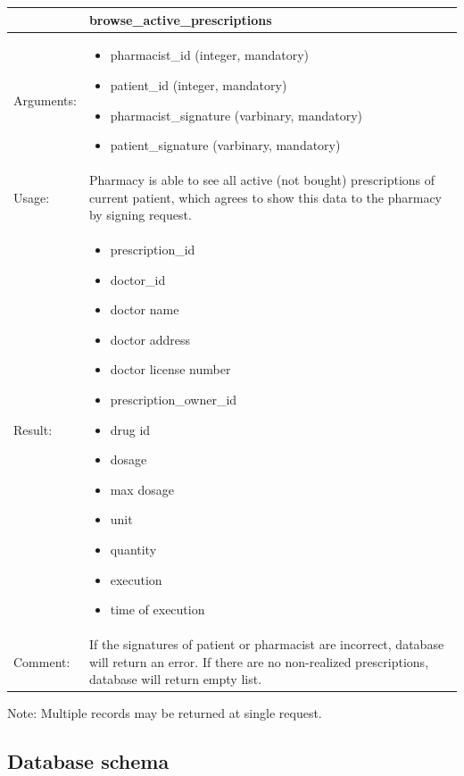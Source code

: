 
    \begin{longtable}{| p{6cm} | p{7.75cm} |}
    \hline
     & browse\_active\_prescriptions \\ \hline
    Arguments: &  \begin{itemize}
    	\item pharmacist\_id (integer, mandatory)
		\item patient\_id (integer, mandatory)
		\item pharmacist\_signature (varbinary, mandatory)
		\item patient\_signature (varbinary, mandatory)
	\end{itemize}     \\ \hline
    Usage: & Pharmacy is able to see all active (not bought) prescriptions of current patient, which agrees to show this data to the pharmacy by signing request. \\ \hline
    Result: & \begin{itemize}
    	\item prescription\_id
    	\item doctor\_id
    	\item doctor name
    	\item doctor address
    	\item doctor license number
    	\item prescription\_owner\_id
    	\item drug id
    	\item dosage
    	\item max dosage
    	\item unit
    	\item quantity
    	\item execution
    	\item time of execution
	\end{itemize}     \\ \hline	
		Comment: & If the signatures of patient or pharmacist are incorrect, database will return an error. If there are no non-realized prescriptions, database will return empty list.\\ \hline
    \end{longtable}
Note: Multiple records may be returned at single request.

\subsection{Database schema}

